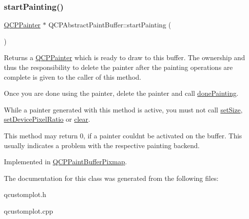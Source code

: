 \subsubsection{\texorpdfstring{start\+Painting()}{startPainting()}}
{\footnotesize\ttfamily \hyperlink{classQCPPainter}{Q\+C\+P\+Painter} $\ast$ Q\+C\+P\+Abstract\+Paint\+Buffer\+::start\+Painting (\begin{DoxyParamCaption}{ }\end{DoxyParamCaption})\hspace{0.3cm}{\ttfamily [pure virtual]}}

Returns a \hyperlink{classQCPPainter}{Q\+C\+P\+Painter} which is ready to draw to this buffer. The ownership and thus the responsibility to delete the painter after the painting operations are complete is given to the caller of this method.

Once you are done using the painter, delete the painter and call \hyperlink{classQCPAbstractPaintBuffer_a41b0dc6e7744f19fae09f8532c207dc1}{done\+Painting}.

While a painter generated with this method is active, you must not call \hyperlink{classQCPAbstractPaintBuffer_a8b68c3cd36533f1a4a23b5ce8cd66f01}{set\+Size}, \hyperlink{classQCPAbstractPaintBuffer_a555eaad5d5c806420ff35602a1bb68fa}{set\+Device\+Pixel\+Ratio} or \hyperlink{classQCPAbstractPaintBuffer_a9e253f4541dfc01992b77e8830bd7722}{clear}.

This method may return 0, if a painter couldn\textquotesingle{}t be activated on the buffer. This usually indicates a problem with the respective painting backend. 

Implemented in \hyperlink{classQCPPaintBufferPixmap_a357964ef7d28cfa530338be4e5c93234}{Q\+C\+P\+Paint\+Buffer\+Pixmap}.



The documentation for this class was generated from the following files\+:\begin{DoxyCompactItemize}
\item 
qcustomplot.\+h\item 
qcustomplot.\+cpp\end{DoxyCompactItemize}
